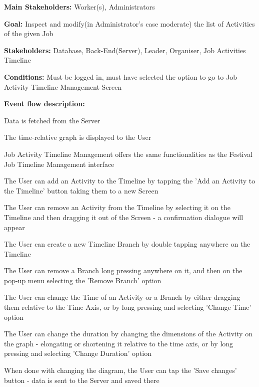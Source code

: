 			\noindent {}
			\begin{packed_item}
				\item \textbf{Main Stakeholders:} Worker(s), Administrators
				\item \textbf{Goal:} Inspect and modify(in Administrator's case moderate) the list of Activities of the given Job
				\item \textbf{Stakeholders: } Database, Back-End(Server), Leader, Organiser, Job Activities Timeline
				\item \textbf{Conditions: } Must be logged in, must have selected the option to go to Job Activity Timeline Management Screen
				\item \textbf{Event flow description: }
				\begin{packed_enum}
					\item Data is fetched from the Server
					\item The time-relative graph is displayed to the User
					\item Job Activity Timeline Management offers the same functionalities as the Festival Job Timeline Management interface
					\item The User can add an Activity to the Timeline by tapping the 'Add an Activity to the Timeline' button taking them to a new Screen
					\item The User can remove an Activity from the Timeline by selecting it on the Timeline and then dragging it out of the Screen - a confirmation dialogue will appear
					\item The User can create a new Timeline Branch by double tapping anywhere on the Timeline
					\item The User can remove a Branch long pressing anywhere on it, and then on the pop-up menu selecting the 'Remove Branch' option
					\item The User can change the Time of an Activity or a Branch by either dragging them relative to the Time Axis, or by long pressing and selecting 'Change Time' option
					\item The User can change the duration by changing the dimensions of the Activity on the graph - elongating or shortening it relative to the time axis, or by long pressing and selecting 'Change Duration' option
					\item When done with changing the diagram, the User can tap the 'Save changes' button - data is sent to the Server and saved there
					\item 
				\end{packed_enum}
				

\end{packed_item}
